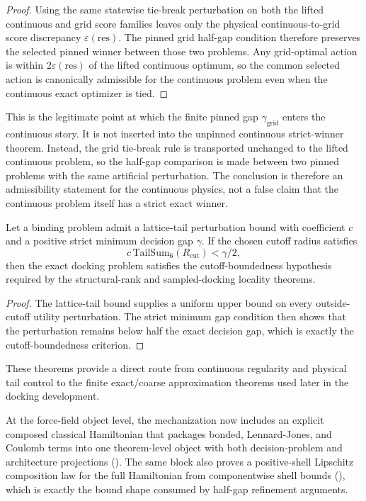 \begin{proof}
Using the same statewise tie-break perturbation on both the lifted continuous and grid score families leaves only the physical continuous-to-grid score discrepancy $\varepsilon(\mathrm{res})$. The pinned grid half-gap condition therefore preserves the selected pinned winner between those two problems. Any grid-optimal action is within $2\varepsilon(\mathrm{res})$ of the lifted continuous optimum, so the common selected action is canonically admissible for the continuous problem even when the continuous exact optimizer is tied.
\end{proof}

This is the legitimate point at which the finite pinned gap $\gamma_{\mathrm{grid}}$ enters the continuous story. It is not inserted into the unpinned continuous strict-winner theorem. Instead, the grid tie-break rule is transported unchanged to the lifted continuous problem, so the half-gap comparison is made between two pinned problems with the same artificial perturbation. The conclusion is therefore an admissibility statement for the continuous physics, not a false claim that the continuous problem itself has a strict exact winner.

\begin{theorem}\label{thm:large-cutoff-bounded}
Let a binding problem admit a lattice-tail perturbation bound with coefficient $c$ and a positive strict minimum decision gap $\gamma$. If the chosen cutoff radius satisfies
\[
c\,\mathrm{TailSum}_6(R_{\mathrm{cut}}) < \gamma/2,
\]
then the exact docking problem satisfies the cutoff-boundedness hypothesis required by the structural-rank and sampled-docking locality theorems.
\end{theorem}

\begin{proof}
The lattice-tail bound supplies a uniform upper bound on every outside-cutoff utility perturbation. The strict minimum gap condition then shows that the perturbation remains below half the exact decision gap, which is exactly the cutoff-boundedness criterion.
\end{proof}

These theorems provide a direct route from continuous regularity and physical tail control to the finite exact/coarse approximation theorems used later in the docking development.

At the force-field object level, the mechanization now includes an explicit composed classical Hamiltonian that packages bonded, Lennard-Jones, and Coulomb terms into one theorem-level object with both decision-problem and architecture projections (). The same block also proves a positive-shell Lipschitz composition law for the full Hamiltonian from componentwise shell bounds (), which is exactly the bound shape consumed by half-gap refinement arguments.


